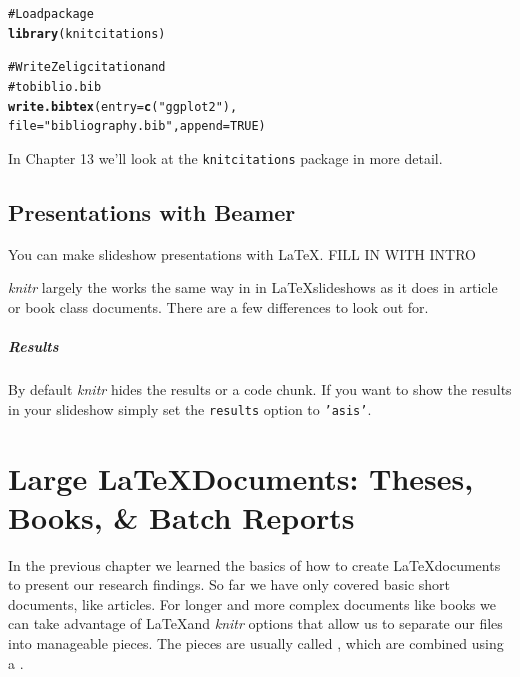 \documentclass[ChapterTOCs,krantz1]{krantz}\usepackage{graphicx, color}
\makeatletter
\newcommand{\hlfunctioncall}[1]{\textcolor[rgb]{0.501960784313725,0,0.329411764705882}{\textbf{#1}}}%
\newcommand{\hlstring}[1]{\textcolor[rgb]{0.6,0.6,1}{#1}}%
\newcommand{\hlcomment}[1]{\textcolor[rgb]{0.180392156862745,0.6,0.341176470588235}{#1}}%
\newenvironment{kframe}{%
 \def\at@end@of@kframe{}%
 \ifinner\ifhmode%
  \def\at@end@of@kframe{\end{minipage}}%
  \begin{minipage}{\columnwidth}%
 \fi\fi%
 \def\FrameCommand##1{\hskip\@totalleftmargin \hskip-\fboxsep
 \colorbox{shadecolor}{##1}\hskip-\fboxsep
     \hskip-\linewidth \hskip-\@totalleftmargin \hskip\columnwidth}%
 \MakeFramed {\advance\hsize-\width
   \@totalleftmargin\z@ \linewidth\hsize
   \@setminipage}}%
 {\par\unskip\endMakeFramed%
 \at@end@of@kframe}
\newenvironment{knitrout}{}{} %
\makeatother
\begin{document}
\begin{knitrout}
\color{fgcolor}\begin{kframe}
\begin{alltt}
\hlcomment{# Load package}
\hlfunctioncall{library}(knitcitations)
 
\hlcomment{# Write Zelig citation and}
\hlcomment{# to biblio.bib}
\hlfunctioncall{write.bibtex}(entry = \hlfunctioncall{c}(\hlstring{"ggplot2"}), 
              file = \hlstring{"bibliography.bib"}, append = TRUE)
\end{alltt}
\end{kframe}
\end{knitrout}


\noindent In Chapter 13 we'll look at the \texttt{knitcitations} package in more detail.

\section{Presentations with Beamer}

You can make slideshow presentations with \LaTeX. FILL IN WITH INTRO

{\emph{knitr}} largely the works the same way in in \LaTeX slideshows as it does in article or book class documents. There are a few differences to look out for. 

\paragraph{Results}

By default {\emph{knitr}} hides the results or a code chunk. If you want to show the results in your slideshow simply set the {\tt{results}} option to {\tt{'asis'}}.




\chapter{Large \LaTeX Documents: Theses, Books, \& Batch Reports}\label{LargeDocs}

In the previous chapter we learned the basics of how to create \LaTeX documents to present our research findings. So far we have only covered basic short documents, like articles. For longer and more complex documents like books we can take advantage of \LaTeX and {\emph{knitr}} options that allow us to separate our files into manageable pieces. The pieces are usually called , which are combined using a .
\end{document}
